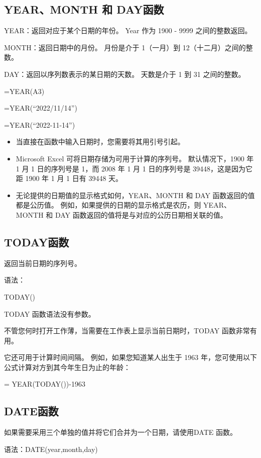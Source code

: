 \subsection{YEAR、MONTH 和 DAY函数}

YEAR：返回对应于某个日期的年份。 Year 作为 1900 - 9999 之间的整数返回。

MONTH：返回日期中的月份。 月份是介于 1（一月）到 12（十二月）之间的整数。

DAY：返回以序列数表示的某日期的天数。 天数是介于 1 到 31 之间的整数。

=YEAR(A3)

=YEAR(``2022/11/14'')

=YEAR(``2022-11-14'')

\begin{itemize}
    \item 当直接在函数中输入日期时，您需要将其用引号引起。
    \item Microsoft Excel 可将日期存储为可用于计算的序列号。 默认情况下，1900 年 1 月 1 日的序列号是 1，而 2008 年 1 月 1 日的序列号是 39448，这是因为它距 1900 年 1 月 1 日有 39448 天。
    \item 无论提供的日期值的显示格式如何，YEAR、MONTH 和 DAY 函数返回的值都是公历值。 例如，如果提供的日期的显示格式是农历，则 YEAR、MONTH 和 DAY 函数返回的值将是与对应的公历日期相关联的值。
\end{itemize}

\subsection{TODAY函数}

返回当前日期的序列号。

语法：

TODAY()

TODAY 函数语法没有参数。

不管您何时打开工作薄，当需要在工作表上显示当前日期时，TODAY 函数非常有用。 

它还可用于计算时间间隔。 例如，如果您知道某人出生于 1963 年，您可使用以下公式计算对方到其今年生日为止的年龄：

= YEAR(TODAY())-1963

\subsection{DATE函数}

如果需要采用三个单独的值并将它们合并为一个日期，请使用DATE 函数。

语法：DATE(year,month,day)

